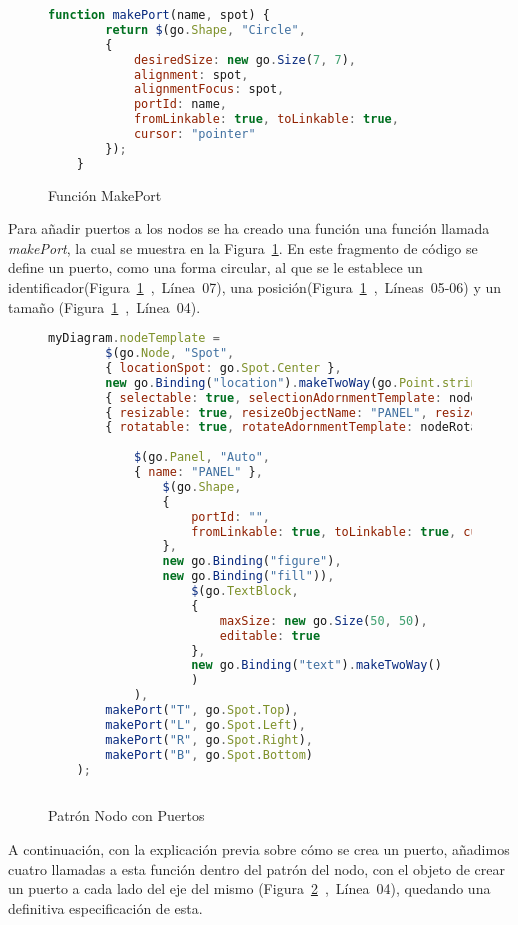 \begin{figure}[!tb]
	\centering
	\begin{lstlisting}[language=JavaScript]
	function makePort(name, spot) {
		return $(go.Shape, "Circle",
		{
			desiredSize: new go.Size(7, 7),
			alignment: spot,  
			alignmentFocus: spot,  
			portId: name,  
			fromLinkable: true, toLinkable: true,  
			cursor: "pointer"  
		});
	}
	\end{lstlisting}
	\caption{Función MakePort}
	\label{fig:funcionMakeport}
\end{figure}
	
Para añadir puertos a los nodos se ha creado una función una función llamada \emph{makePort}, la cual se muestra en la Figura~\ref{fig:funcionMakeport}. En este fragmento de código se define un puerto, como una forma circular, al que se le establece un identificador(Figura~\ref{fig:funcionMakeport}~,~Línea~07), una posición(Figura~\ref{fig:funcionMakeport}~,~Líneas~05-06) y un tamaño (Figura~\ref{fig:funcionMakeport}~,~Línea~04).



\begin{figure}[!tb]
	\centering
	\begin{lstlisting}[language=JavaScript]
	myDiagram.nodeTemplate =
		$(go.Node, "Spot",
		{ locationSpot: go.Spot.Center },
		new go.Binding("location").makeTwoWay(go.Point.stringify),
		{ selectable: true, selectionAdornmentTemplate: nodeSelectionAdornmentTemplate },
		{ resizable: true, resizeObjectName: "PANEL", resizeAdornmentTemplate: nodeResizeAdornmentTemplate },
		{ rotatable: true, rotateAdornmentTemplate: nodeRotateAdornmentTemplate },
		
			$(go.Panel, "Auto",
			{ name: "PANEL" },
				$(go.Shape,  
				{
					portId: "", 
					fromLinkable: true, toLinkable: true, cursor: "pointer",
				},
				new go.Binding("figure"),
				new go.Binding("fill")),
					$(go.TextBlock,
					{
						maxSize: new go.Size(50, 50),
						editable: true
					},
					new go.Binding("text").makeTwoWay()
					)
			),
		makePort("T", go.Spot.Top),
		makePort("L", go.Spot.Left),
		makePort("R", go.Spot.Right),
		makePort("B", go.Spot.Bottom)
	);
	
	\end{lstlisting}
	\caption{Patrón Nodo con Puertos}
	\label{fig:patronNodoFinal}
\end{figure}


A continuación, con la explicación previa sobre cómo se crea un puerto,  añadimos cuatro llamadas a esta función dentro del patrón del nodo, con el objeto de crear un puerto a cada lado del eje del mismo (Figura~\ref{fig:patronNodoFinal}~,~Línea~04), quedando una definitiva especificación de esta.


